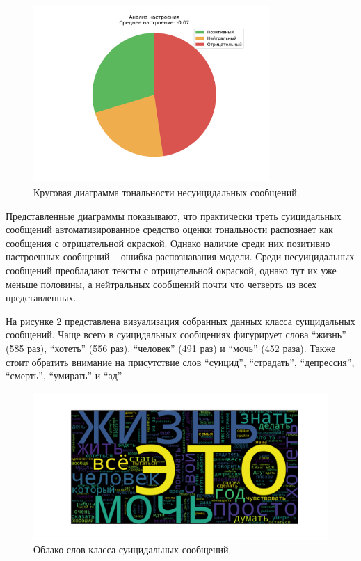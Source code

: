 \begin{figure}[H]
	\centering
	\includegraphics[width=0.8\textwidth]{inc/plots/sentiments_non_suicidal.pdf}
	\caption{ Круговая диаграмма тональности несуицидальных сообщений. }
	\label{img:sentiments2}
\end{figure}

Представленные диаграммы показывают, что практически треть суицидальных сообщений автоматизированное средство оценки тональности распознает как сообщения с отрицательной окраской. Однако наличие среди них позитивно настроенных сообщений -- ошибка распознавания модели. Среди несуицидальных сообщений преобладают тексты с отрицательной окраской, однако тут их уже меньше половины, а нейтральных сообщений почти что четверть из всех представленных. 

На рисунке \ref{img:cloud1} представлена визуализация собранных данных класса суицидальных сообщений. Чаще всего в суицидальных сообщениях фигурирует слова ``жизнь'' (585 раз), ``хотеть'' (556 раз), ``человек'' (491 раз) и ``мочь'' (452 раза). Также стоит обратить внимание на присутствие слов ``суицид'', ``страдать'', ``депрессия'', ``смерть'', ``умирать'' и ``ад''.

\begin{figure}[H]
	\centering
	\includegraphics[width=\textwidth]{inc/cloudSuicidal.pdf}
	\caption{ Облако слов класса суицидальных сообщений. }
	\label{img:cloud1}
\end{figure}


